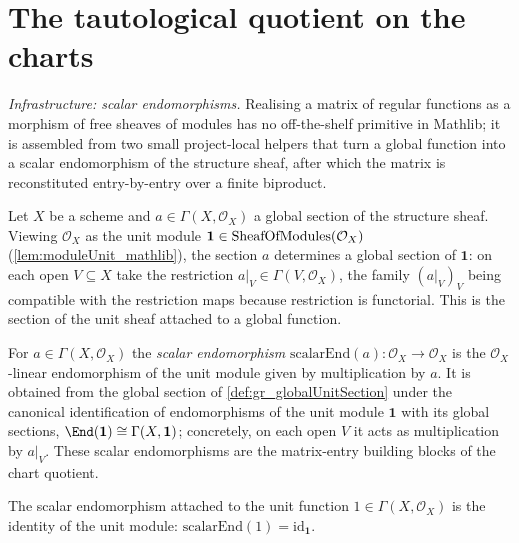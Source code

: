 \section{The tautological quotient on the charts}
\label{sec:grquot_chart}

\emph{Infrastructure: scalar endomorphisms.} Realising a matrix of regular
functions as a morphism of free sheaves of modules has no off-the-shelf primitive
in Mathlib; it is assembled from two small project-local helpers that turn a global
function into a scalar endomorphism of the structure sheaf, after which the matrix
is reconstituted entry-by-entry over a finite biproduct.

\begin{definition}
  \label{def:gr_globalUnitSection}
  Let \(X\) be a scheme and \(a \in \Gamma(X, \mathcal{O}_X)\) a global section of
  the structure sheaf. Viewing \(\mathcal{O}_X\) as the unit module
  \(\mathbf{1} \in \mathrm{SheafOfModules}(\mathcal{O}_X)\) (\cref{lem:moduleUnit_mathlib}), the
  section \(a\) determines a global section of \(\mathbf{1}\): on each open
  \(V \subseteq X\) take the restriction \(a|_V \in \Gamma(V, \mathcal{O}_X)\), the
  family \((a|_V)_V\) being compatible with the restriction maps because
  restriction is functorial. This is the section of the unit sheaf attached to a
  global function.
\end{definition}

\begin{definition}
  \label{def:gr_scalarEnd}
  For \(a \in \Gamma(X, \mathcal{O}_X)\) the \emph{scalar endomorphism}
  \(\mathrm{scalarEnd}(a) : \mathcal{O}_X \to \mathcal{O}_X\) is the
  \(\mathcal{O}_X\)-linear endomorphism of the unit module given by multiplication
  by \(a\). It is obtained from the global section of \cref{def:gr_globalUnitSection}
  under the canonical identification of endomorphisms of the unit module
  \(\mathbf{1}\) with its global sections, \(\End(\mathbf{1}) \cong
  \Gamma(X, \mathbf{1})\); concretely, on each open \(V\) it acts as
  multiplication by \(a|_V\). These scalar endomorphisms are the matrix-entry
  building blocks of the chart quotient.
\end{definition}

\begin{lemma}
  \label{lem:gr_scalarEnd_one}
  The scalar endomorphism attached to the unit function \(1 \in
  \Gamma(X, \mathcal{O}_X)\) is the identity of the unit module:
  \(\mathrm{scalarEnd}(1) = \mathrm{id}_{\mathbf{1}}\).
\end{lemma}

